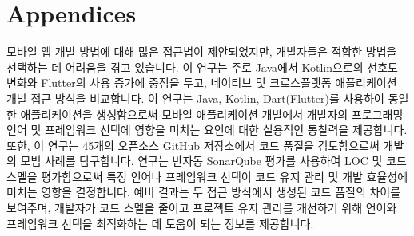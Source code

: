 \documentclass[11pt,jaso]{pnumasterh}
\begin{document}
% 


\nocite{*}


\clearpage

\appendix
\section*{Appendices}

\clearpage

\begin{eabstract}
    모바일 앱 개발 방법에 대해 많은 접근법이 제안되었지만, 개발자들은 적합한 방법을 선택하는 데 어려움을 겪고 있습니다. 이 연구는 주로 Java에서 Kotlin으로의 선호도 변화와 Flutter의 사용 증가에 중점을 두고, 네이티브 및 크로스플랫폼 애플리케이션 개발 접근 방식을 비교합니다. 이 연구는 Java, Kotlin, Dart(Flutter)를 사용하여 동일한 애플리케이션을 생성함으로써 모바일 애플리케이션 개발에서 개발자의 프로그래밍 언어 및 프레임워크 선택에 영향을 미치는 요인에 대한 실용적인 통찰력을 제공합니다. 또한, 이 연구는 45개의 오픈소스 GitHub 저장소에서 코드 품질을 검토함으로써 개발의 모범 사례를 탐구합니다. 연구는 반자동 SonarQube 평가를 사용하여 LOC 및 코드 스멜을 평가함으로써 특정 언어나 프레임워크 선택이 코드 유지 관리 및 개발 효율성에 미치는 영향을 결정합니다. 예비 결과는 두 접근 방식에서 생성된 코드 품질의 차이를 보여주며, 개발자가 코드 스멜을 줄이고 프로젝트 유지 관리를 개선하기 위해 언어와 프레임워크 선택을 최적화하는 데 도움이 되는 정보를 제공합니다.
\end{eabstract}

%
\end{document}
